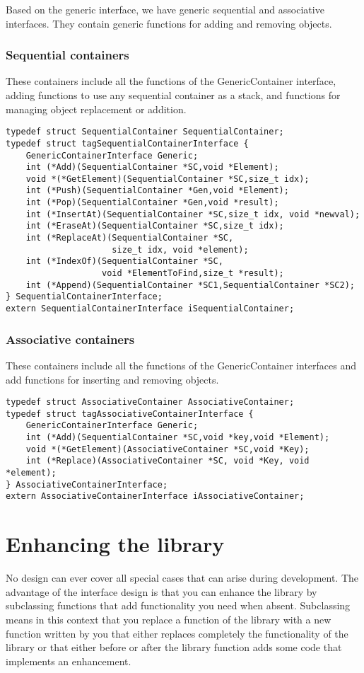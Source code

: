 \documentclass[12pt,a4paper]{memoir} %
\begin{document}
{{Based on the generic interface, we have generic sequential and associative interfaces. They contain generic functions for adding and removing objects.
\subsection{Sequential containers}
These containers include all the functions of the GenericContainer interface, adding functions to use any sequential container as a stack, and functions for managing object replacement or addition.
\begin{verbatim}
typedef struct SequentialContainer SequentialContainer;
typedef struct tagSequentialContainerInterface {
    GenericContainerInterface Generic;
    int (*Add)(SequentialContainer *SC,void *Element);
    void *(*GetElement)(SequentialContainer *SC,size_t idx);
    int (*Push)(SequentialContainer *Gen,void *Element);
    int (*Pop)(SequentialContainer *Gen,void *result);
    int (*InsertAt)(SequentialContainer *SC,size_t idx, void *newval);
    int (*EraseAt)(SequentialContainer *SC,size_t idx);
    int (*ReplaceAt)(SequentialContainer *SC, 
                     size_t idx, void *element);
    int (*IndexOf)(SequentialContainer *SC,
                   void *ElementToFind,size_t *result);
    int (*Append)(SequentialContainer *SC1,SequentialContainer *SC2);
} SequentialContainerInterface;
extern SequentialContainerInterface iSequentialContainer;
\end{verbatim}
\subsection{Associative containers}
These containers include all the functions of the GenericContainer interfaces and add functions for inserting and removing objects.
\begin{verbatim}
typedef struct AssociativeContainer AssociativeContainer;
typedef struct tagAssociativeContainerInterface {
    GenericContainerInterface Generic;
    int (*Add)(SequentialContainer *SC,void *key,void *Element);
    void *(*GetElement)(AssociativeContainer *SC,void *Key);
    int (*Replace)(AssociativeContainer *SC, void *Key, void *element);
} AssociativeContainerInterface;
extern AssociativeContainerInterface iAssociativeContainer;
\end{verbatim} 
\chapter{Enhancing the library}
No design can ever cover all special cases that can arise during development. The advantage of the interface design is that you can enhance the library by subclassing functions that add functionality you need when absent.
Subclassing means in this context that you replace a function of the library with a new function written by you that either replaces completely the functionality of the library or that either before or after the library function adds some code that implements an enhancement.

}}
\end{document}
